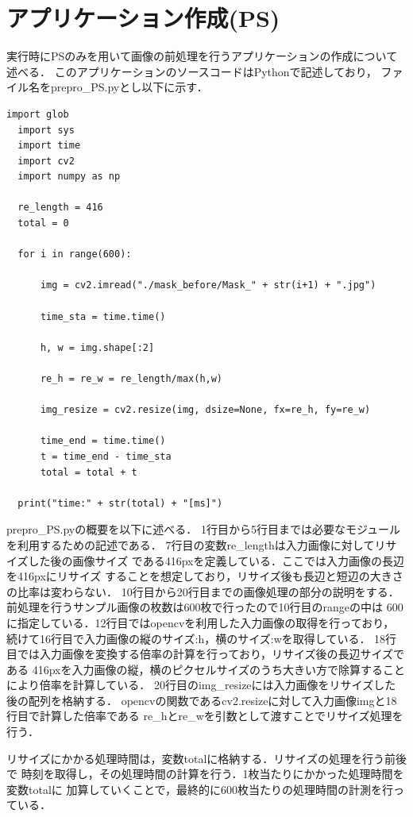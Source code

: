 \documentclass[11pt,a4j]{jreport}
\begin{document}
\section{アプリケーション作成(PS)}
実行時にPSのみを用いて画像の前処理を行うアプリケーションの作成について述べる．
このアプリケーションのソースコードはPythonで記述しており，
ファイル名をprepro_PS.pyとし以下に示す．
\begin{lstlisting}[caption=prepro_PS.py]
  import glob
  import sys
  import time
  import cv2
  import numpy as np
  
  re_length = 416
  total = 0
  
  for i in range(600):
  
      img = cv2.imread("./mask_before/Mask_" + str(i+1) + ".jpg")
  
      time_sta = time.time()
  
      h, w = img.shape[:2]
  
      re_h = re_w = re_length/max(h,w)
  
      img_resize = cv2.resize(img, dsize=None, fx=re_h, fy=re_w)
  
      time_end = time.time()
      t = time_end - time_sta
      total = total + t
  
  print("time:" + str(total) + "[ms]")
\end{lstlisting}
prepro_PS.pyの概要を以下に述べる．
1行目から5行目までは必要なモジュールを利用するための記述である．
7行目の変数re_lengthは入力画像に対してリサイズした後の画像サイズ
である416pxを定義している．ここでは入力画像の長辺を416pxにリサイズ
することを想定しており，リサイズ後も長辺と短辺の大きさの比率は変わらない．
10行目から20行目までの画像処理の部分の説明をする．
前処理を行うサンプル画像の枚数は600枚で行ったので10行目のrangeの中は
600に指定している．12行目ではopencvを利用した入力画像の取得を行っており，
続けて16行目で入力画像の縦のサイズ:h，横のサイズ:wを取得している．
18行目では入力画像を変換する倍率の計算を行っており，リサイズ後の長辺サイズである
416pxを入力画像の縦，横のピクセルサイズのうち大きい方で除算することにより倍率を計算している．
20行目のimg_resizeには入力画像をリサイズした後の配列を格納する．
opencvの関数であるcv2.resizeに対して入力画像imgと18行目で計算した倍率である
re_hとre_wを引数として渡すことでリサイズ処理を行う．

リサイズにかかる処理時間は，変数totalに格納する．リサイズの処理を行う前後で
時刻を取得し，その処理時間の計算を行う．1枚当たりにかかった処理時間を変数totalに
加算していくことで，最終的に600枚当たりの処理時間の計測を行っている．
\end{document}
